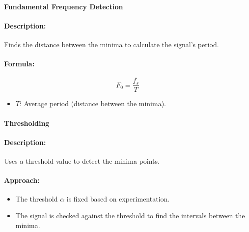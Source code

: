\documentclass{ieeeaccess}
\begin{document}
\paragraph{Fundamental Frequency Detection}

\paragraph{Description:}
Finds the distance between the minima to calculate the signal's period.

\paragraph{Formula:}
\begin{equation}
F_0 = \frac{f_s}{T}
\label{eq:fundamental_frequency}
\end{equation}

\begin{itemize}
    \item \( T \): Average period (distance between the minima).
\end{itemize}

\paragraph{Thresholding}

\paragraph{Description:}
Uses a threshold value to detect the minima points.

\paragraph{Approach:}
\begin{itemize}
    \item The threshold \( \alpha \) is fixed based on experimentation.
    \item The signal is checked against the threshold to find the intervals between the minima.
\end{itemize}
\end{document}
